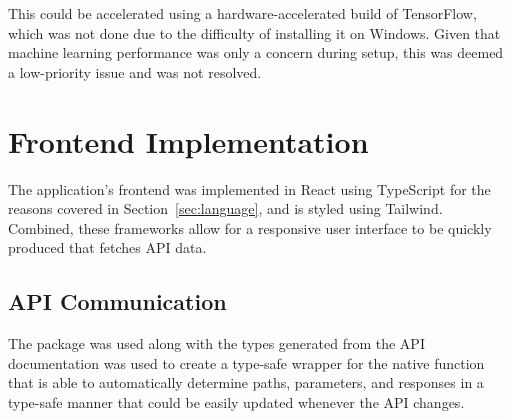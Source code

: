 This could be accelerated using a hardware-accelerated build of TensorFlow, which was not done due to the difficulty of installing
it on Windows. Given that machine learning performance was only a concern during setup, this was deemed a low-priority
issue and was not resolved.

\section{Frontend Implementation}

The application's frontend was implemented in React using TypeScript for the reasons covered in
Section~\ref{sec:language}, and is styled using Tailwind. Combined, these frameworks allow for a responsive
user interface to be quickly produced that fetches API data.

\subsection{API Communication}
The  package was used along with the types generated from the API documentation was
used to create a type-safe wrapper for the native  function that is able to automatically
determine paths, parameters, and responses in a type-safe manner that could be easily updated whenever the API
changes.

